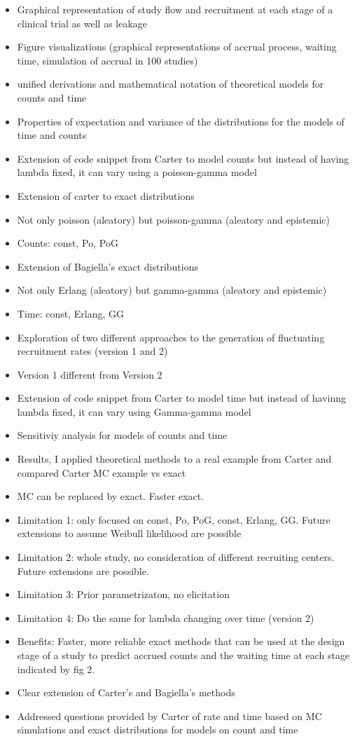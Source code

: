 \begin{itemize}
\item Graphical representation of study flow and recruitment at each stage of a clinical trial as well as leakage
\item Figure visualizations (graphical representations of accrual process, waiting time, simulation of accrual in 100 studies)
\item unified derivations and mathematical notation of theoretical models for counts and time
\item Properties of expectation and variance of the distributions for the models of time and counts
\item Extension of code snippet from Carter to model counts but instead of having lambda fixed, it can vary using a poisson-gamma model
\item Extension of carter to exact distributions
\item Not only poisson (aleatory) but poisson-gamma (aleatory and epistemic)
\item Counts: const, Po, PoG
\item Extension of Bagiella's exact distributions
\item Not only Erlang (aleatory) but gamma-gamma (aleatory and epistemic)
\item Time: const, Erlang, GG
\item Exploration of two different approaches to the generation of fluctuating recruitment rates (version 1 and 2)
\item Version 1 different from Version 2
\item Extension of code snippet from Carter to model time but instead of havinng lambda fixed, it can vary using Gamma-gamma model
\item Sensitiviy analysis for models of counts and time
\item Results, I applied theoretical methods to a real example from Carter and compared Carter MC example vs exact
\item MC can be replaced by exact. Faster exact.
\item Limitation 1: only focused on const, Po, PoG, const, Erlang, GG. Future extensions to assume Weibull likelihood are possible
\item Limitation 2: whole study, no consideration of different recruiting centers. Future extensions are possible.
\item Limitation 3: Prior parametrizaton, no elicitation
\item Limitation 4: Do the same for lambda changing over time (version 2)
\item Benefits: Faster, more reliable exact methods that can be used at the design stage of a study to predict accrued counts and the waiting time at each stage indicated by fig 2.
\item Clear extension of Carter's and Bagiella's methods
\item Addressed questions provided by Carter of rate and time based on MC simulations and exact distributions for models on count and time
\end{itemize}
